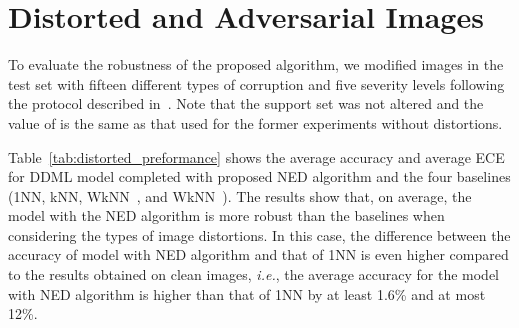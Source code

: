 \documentclass{article}
\newcommand{\ie}{{\it i.e.}}
\begin{document}
\section{Distorted and Adversarial Images}
To evaluate the robustness of the proposed algorithm, we modified images in the test set with fifteen different types of corruption and five severity levels following the protocol described in~\cite{b36}.
Note that the support set was not altered and the value of  is the same as that used for the former experiments without distortions.

Table~\ref{tab:distorted_preformance} shows the average accuracy and average ECE for DDML model completed with proposed NED algorithm and the four baselines (1NN, kNN, WkNN~\cite{b70}, and WkNN~\cite{b69}).
The results show that, on average, the model with the NED algorithm is more robust than the baselines when considering the types of image distortions.
In this case, the difference between the accuracy of model with NED algorithm and that of 1NN is even higher
compared to the results obtained on clean images,
\ie, the average accuracy for the model with NED algorithm is higher than that of 1NN by at least 1.6\% and at most 12\%.

\begin{table*}[h]
	\begin{center}
		\caption{The average accuracy and average ECE for DDML model with proposed NED algorithm and the four baselines (1NN, kNN, WkNN~\cite{b70}, and WkNN~\cite{b69}) when images in test data are distorted with common corruption types~\cite{b36}.   The proposed approach consistently outperforms the baseline methods for all experiments.   }
		\label{tab:distorted_preformance}
	\end{center}
\end{table*}
\end{document}
